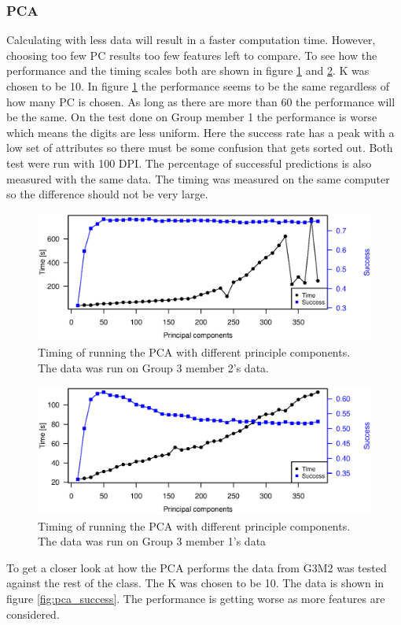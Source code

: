 \begin{figure}[H]
\centering
{}
\end{figure}




\subsubsection{PCA}

Calculating with less data will result in a faster computation time.
However, choosing too few PC results too few features left to compare.
To see how the performance and the timing scales both are shown in figure \ref{fig:pca_timing_lukas} and \ref{fig:pca_timing_nikolaj}. K was chosen to be 10.
In figure \ref{fig:pca_timing_lukas} the performance seems to be the same regardless of how many PC is chosen. As long as there are more than 60 the performance will be the same.
On the test done on Group member 1 the performance is worse which means the digits are less uniform. 
Here the success rate has a peak with a low set of attributes so there must be some confusion that gets sorted out. 
Both test were run with 100 DPI. The percentage of successful predictions is also measured with the same data.
The timing was measured on the same computer so the difference should not be very large. 

\begin{figure}[H]
\centering
\includegraphics[width =0.8 \textwidth]{graphics/pca_timing}
\caption[Timing of PCA]{Timing of running the PCA with different principle components. 
The data was run on Group 3 member 2's data. 
}
\label{fig:pca_timing_lukas}
\end{figure}
\begin{figure}[H]
\centering
\includegraphics[width =0.8 \textwidth]{graphics/pca_timing_nikolaj}
\caption[Timing of PCA]{Timing of running the PCA with different principle components. 
The data was run on Group 3 member 1's data}
\label{fig:pca_timing_nikolaj}
\end{figure}

To get a closer look at how the PCA performs the data from G3M2 was tested against the rest of the class. 
The K was chosen to be 10. 
The data is shown in figure \ref{fig:pca_success}.
The performance is getting worse as more features are considered.
